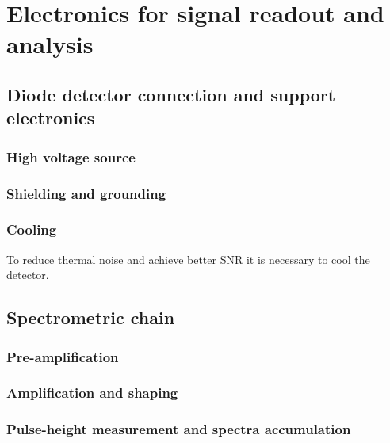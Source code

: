
\chapter{Electronics for signal readout and analysis}
\section{Diode detector connection and support electronics}
\subsection{High voltage source}
\subsection{Shielding and grounding}
\subsection{Cooling}
To reduce thermal noise and achieve better SNR it is necessary to cool the detector.

\section{Spectrometric chain}
\subsection{Pre-amplification}
\subsection{Amplification and shaping}
\subsection{Pulse-height measurement and spectra accumulation}




